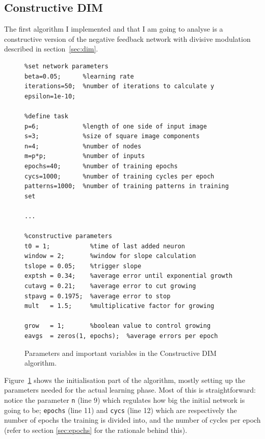 \documentclass[11pt,a4paper]{report}
\begin{document}
			\subsection{Constructive DIM}
				The first algorithm I implemented and that I am going to analyse is a constructive version of the negative feedback network with divisive modulation described in section~\ref{sec:dim}.
			
				\begin{figure}[h]
					\caption{Parameters and important variables in the Constructive DIM algorithm.}
					\label{lst:params_cdim}
					\centering
\begin{lstlisting}
%set network parameters
beta=0.05;      %learning rate
iterations=50;  %number of iterations to calculate y
epsilon=1e-10;

%define task
p=6;            %length of one side of input image
s=3;            %size of square image components
n=4;            %number of nodes
m=p*p;          %number of inputs
epochs=40;      %number of training epochs
cycs=1000;      %number of training cycles per epoch
patterns=1000;  %number of training patterns in training set

...

%constructive parameters
t0 = 1;           %time of last added neuron
window = 2;       %window for slope calculation
tslope = 0.05;    %trigger slope
exptsh = 0.34;    %average error until exponential growth
cutavg = 0.21;    %average error to cut growing
stpavg = 0.1975;  %average error to stop
mult   = 1.5;     %multiplicative factor for growing

grow   = 1;       %boolean value to control growing
eavgs  = zeros(1, epochs);  %average errors per epoch
\end{lstlisting}
				\end{figure}
				
				Figure~\ref{lst:params_cdim} shows the initialisation part of the algorithm, mostly setting up the parameters needed for the actual learning phase. Most of this is straightforward: notice the parameter \texttt{n} (line 9) which regulates how big the initial network is going to be; \texttt{epochs} (line 11) and \texttt{cycs} (line 12) which are respectively the number of epochs the training is divided into, and the number of cycles per epoch (refer to section \ref{sec:epochs} for the rationale behind this).
				
\end{document}
